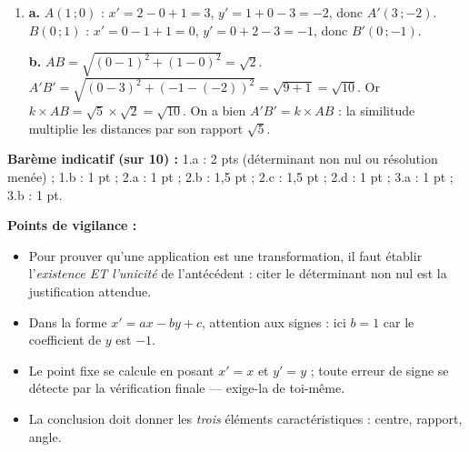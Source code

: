 \documentclass[11pt]{article}
\begin{document}
\begin{corrige}
\begin{enumerate}
\textbf{c.} Le point fixe $\Omega$ vérifie $f(\Omega) = \Omega$ :
\[ \begin{cases} x_\Omega = 2x_\Omega - y_\Omega + 1 \\ y_\Omega = x_\Omega + 2y_\Omega - 3 \end{cases} \iff \begin{cases} x_\Omega - y_\Omega = -1 \\ x_\Omega + y_\Omega = 3 \end{cases} \]
En additionnant les deux équations : $2x_\Omega = 2$, donc $x_\Omega = 1$ ; puis $y_\Omega = 3 - 1 = 2$.
Vérification : $f(1\,;2)$ donne $x' = 2 - 2 + 1 = 1$ et $y' = 1 + 4 - 3 = 2$. Donc $\Omega(1\,;2)$ est l'unique point fixe.

\textbf{d.} \textbf{Conclusion :} $f$ est la \textbf{similitude directe de centre $\Omega(1\,;2)$, de rapport $k = \sqrt{5}$ et d'angle $\theta$ tel que $\cos\theta = \dfrac{2\sqrt{5}}{5}$ et $\sin\theta = \dfrac{\sqrt{5}}{5}$} ($\theta \approx \num{0,464}$ rad). En effet, en retranchant les coordonnées de $\Omega$, l'écriture devient $\begin{cases} x' - 1 = 2(x-1) - (y-2) \\ y' - 2 = (x-1) + 2(y-2) \end{cases}$, forme canonique de la similitude directe de centre $\Omega$.

\item \textbf{a.} $A(1\,;0)$ : $x' = 2 - 0 + 1 = 3$, $y' = 1 + 0 - 3 = -2$, donc $A'(3\,;-2)$. $B(0\,;1)$ : $x' = 0 - 1 + 1 = 0$, $y' = 0 + 2 - 3 = -1$, donc $B'(0\,;-1)$.

\textbf{b.} $AB = \sqrt{(0-1)^2 + (1-0)^2} = \sqrt{2}$. $A'B' = \sqrt{(0-3)^2 + (-1-(-2))^2} = \sqrt{9 + 1} = \sqrt{10}$. Or $k \times AB = \sqrt{5} \times \sqrt{2} = \sqrt{10}$. On a bien $A'B' = k \times AB$ : la similitude multiplie les distances par son rapport $\sqrt{5}$.
\end{enumerate}

\textbf{Barème indicatif (sur 10) :} 1.a : 2 pts (déterminant non nul ou résolution menée) ; 1.b : 1 pt ; 2.a : 1 pt ; 2.b : 1,5 pt ; 2.c : 1,5 pt ; 2.d : 1 pt ; 3.a : 1 pt ; 3.b : 1 pt.

\textbf{Points de vigilance :}
\begin{itemize}
\item Pour prouver qu'une application est une transformation, il faut établir l'\emph{existence ET l'unicité} de l'antécédent : citer le déterminant non nul est la justification attendue.
\item Dans la forme $x' = ax - by + c$, attention aux signes : ici $b = 1$ car le coefficient de $y$ est $-1$.
\item Le point fixe se calcule en posant $x' = x$ et $y' = y$ ; toute erreur de signe se détecte par la vérification finale — exige-la de toi-même.
\item La conclusion doit donner les \emph{trois} éléments caractéristiques : centre, rapport, angle.
\end{itemize}
\end{corrige}
\end{document}
